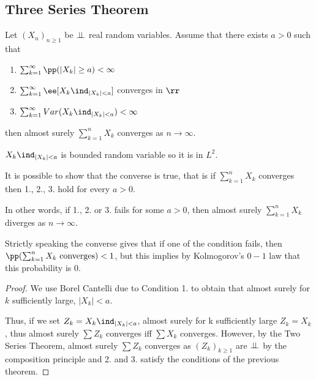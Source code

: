 \documentclass[../main.tex]{subfiles}
\begin{document}
   \subsection{Three Series Theorem}
   \begin{theorem}
     Let $(X_n)_{ n \geq 1}$ be $\perp\!\!\!\!\,\perp$ real random variables. Assume that
     there exists $a > 0$ such that
     \begin{enumerate}
       \item $\sum_{k =1}^\infty \pp(|X_k| \geq a) < \infty$
       \item $\sum_{k=1}^\infty \ee[X_k \ind_{|X_k| < a}]$ converges in $\rr$
       \item $\sum_{k=1}^\infty Var(X_k \ind_{|X_k| < a}) < \infty$ 
     \end{enumerate}
     then almost surely $\sum_{k=1}^n X_k$ converges as $n \to \infty$.
   \end{theorem}
   \begin{remark}
     $X_k \ind_{|X_k| < a}$ is bounded random variable so it is in $L^2$.
   \end{remark}
   \begin{remark}
       It is possible to show that the converse is true, that is if
       $\sum_{k=1}^n X_k$ converges then 1., 2., 3. hold for every $a > 0$.

       \vspace{0.3em}

       \noindent In other words, if 1., 2. or 3. fails for some $a > 0$, then
       almost surely $\sum_{k=1}^n X_k$ diverges as $n \to \infty$.
   \end{remark}
   \begin{remark}
       Strictly speaking the converse gives that if one of the condition
       fails, then $\pp(\sum_{k=1}^n X_k \text{ converges}) < 1$, but this
       implies by Kolmogorov's $0-1$ law that this probability is $0$.
   \end{remark}
   \begin{proof}
      We use Borel Cantelli due to Condition 1. to obtain that almost surely
      for $k$ sufficiently large, $|X_k| < a$.

      \vspace{0.4em}

      Thus, if we set $Z_k = X_k \ind_{|X_k| < a}$, almost surely for k
      sufficiently large $Z_k = X_k$, thus almost surely $\sum Z_k$ converges
      iff $\sum X_k$ converges. However, by the Two Series Theorem, almost
      surely $\sum Z_k$ converges as $(Z_k)_{k \geq 1}$ are $\perp\!\!\!\!\,\perp$ by the
      composition principle and 2. and 3. satisfy the conditions of the
      previous theorem.
   \end{proof}
\end{document}

